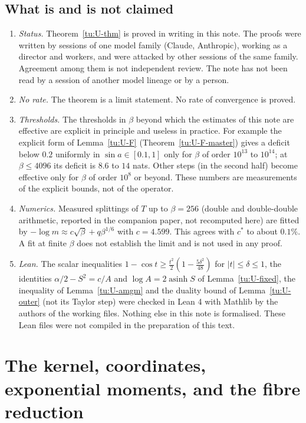 \subsection{What is and is not claimed}\label{tu:U-sec-status}
\begin{enumerate}
\item \emph{Status.} Theorem~\ref{tu:U-thm} is proved in writing in this note. The proofs were written
by sessions of one model family (Claude, Anthropic), working as a director and workers, and were
attacked by other sessions of the same family. Agreement among them is not independent review. The
note has not been read by a session of another model lineage or by a person.
\item \emph{No rate.} The theorem is a limit statement. No rate of convergence is proved.
\item \emph{Thresholds.} The thresholds in $\beta$ beyond which the estimates of this note are
effective are explicit in principle and useless in practice. For example the explicit form of
Lemma~\ref{tu:U-F} (Theorem~\ref{tu:U-F-master}) gives a deficit below $0.2$ uniformly in
$\sin a\in[0.1,1]$ only for $\beta$ of order $10^{13}$ to $10^{14}$; at $\beta\le4096$ its deficit is $8.6$
to $14$ nats. Other steps (in the second half) become effective only for $\beta$ of order $10^{8}$ or
beyond. These numbers are measurements of the explicit bounds, not of the operator.
\item \emph{Numerics.} Measured splittings of $T$ up to $\beta=256$ (double and double-double
arithmetic, reported in the companion paper, not recomputed here) are fitted by
$-\log m\approx c\sqrt\beta+q\beta^{1/6}$ with $c=4.599$. This agrees with $c^*$ to about
$0.1\%$. A fit at finite $\beta$ does not establish the limit and is not used in any proof.
\item \emph{Lean.} The scalar inequalities $1-\cos t\ge\frac{t^2}{2}(1-\frac{5\delta^2}{48})$ for
$|t|\le\delta\le1$, the identities $\alpha/2-S^2=c/A$ and $\log A=2\operatorname{asinh}S$ of
Lemma~\ref{tu:U-fixed}, the inequality of Lemma~\ref{tu:U-amgm} and the duality bound of
Lemma~\ref{tu:U-outer} (not its Taylor step) were checked in Lean 4 with Mathlib by the authors of the
working files. Nothing else in this note is formalised. These Lean files were not compiled in the
preparation of this text.
\end{enumerate}

\section{The kernel, coordinates, exponential moments, and the fibre reduction}\label{tu:U-sec-kernel}

